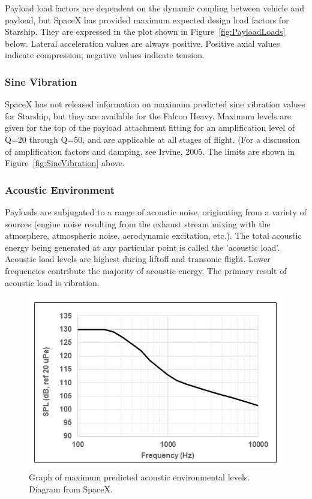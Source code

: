 \documentclass[11pt]{article}
\begin{document}
Payload load factors are dependent on the dynamic coupling between vehicle and payload, but SpaceX has provided maximum expected design load factors for Starship. They are expressed in the plot shown in Figure~\ref{fig:PayloadLoads} below.\cite{spacex01} Lateral acceleration values are always positive. Positive axial values indicate compression; negative values indicate tension.\cite{bellini14}

\subsubsection{Sine Vibration}

SpaceX has not released information on maximum predicted sine vibration values for Starship, but they are available for the Falcon Heavy. Maximum levels are given for the top of the payload attachment fitting for an amplification level of Q=20 through Q=50, and are applicable at all stages of flight. (For a discussion of amplification factors and damping, see Irvine, 2005.\cite{website:irvine05} The limits are shown in Figure~\ref{fig:SineVibration} above.\cite{spacex01}

\subsubsection{Acoustic Environment}
Payloads are subjugated to a range of acoustic noise, originating from a variety of sources (engine noise resulting from the exhaust stream mixing with the atmosphere, atmospheric noise, aerodynamic excitation, etc.). The total acoustic energy being generated at any particular point is called the 'acoustic load'. Acoustic load levels are highest during liftoff and transonic flight. Lower frequencies contribute the majority of acoustic energy. The primary result of acoustic load is vibration.\cite{shakir09}

\begin{figure}[!b]
    \centering
    \includegraphics{assets/AcousticLevels.png}
    \caption{Graph of maximum predicted acoustic environmental levels. Diagram from SpaceX.}
    \label{fig:AcousticLevels}
\end{figure}
\end{document}
